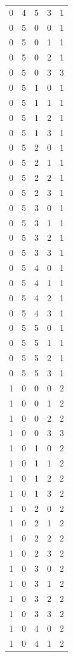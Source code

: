 \begin{longtable}{rrrrr}
0 & 4 & 5 & 3 & 1 \\
0 & 5 & 0 & 0 & 1 \\
0 & 5 & 0 & 1 & 1 \\
0 & 5 & 0 & 2 & 1 \\
0 & 5 & 0 & 3 & 3 \\
0 & 5 & 1 & 0 & 1 \\
0 & 5 & 1 & 1 & 1 \\
0 & 5 & 1 & 2 & 1 \\
0 & 5 & 1 & 3 & 1 \\
0 & 5 & 2 & 0 & 1 \\
0 & 5 & 2 & 1 & 1 \\
0 & 5 & 2 & 2 & 1 \\
0 & 5 & 2 & 3 & 1 \\
0 & 5 & 3 & 0 & 1 \\
0 & 5 & 3 & 1 & 1 \\
0 & 5 & 3 & 2 & 1 \\
0 & 5 & 3 & 3 & 1 \\
0 & 5 & 4 & 0 & 1 \\
0 & 5 & 4 & 1 & 1 \\
0 & 5 & 4 & 2 & 1 \\
0 & 5 & 4 & 3 & 1 \\
0 & 5 & 5 & 0 & 1 \\
0 & 5 & 5 & 1 & 1 \\
0 & 5 & 5 & 2 & 1 \\
0 & 5 & 5 & 3 & 1 \\
1 & 0 & 0 & 0 & 2 \\
1 & 0 & 0 & 1 & 2 \\
1 & 0 & 0 & 2 & 2 \\
1 & 0 & 0 & 3 & 3 \\
1 & 0 & 1 & 0 & 2 \\
1 & 0 & 1 & 1 & 2 \\
1 & 0 & 1 & 2 & 2 \\
1 & 0 & 1 & 3 & 2 \\
1 & 0 & 2 & 0 & 2 \\
1 & 0 & 2 & 1 & 2 \\
1 & 0 & 2 & 2 & 2 \\
1 & 0 & 2 & 3 & 2 \\
1 & 0 & 3 & 0 & 2 \\
1 & 0 & 3 & 1 & 2 \\
1 & 0 & 3 & 2 & 2 \\
1 & 0 & 3 & 3 & 2 \\
1 & 0 & 4 & 0 & 2 \\
1 & 0 & 4 & 1 & 2 \\

\end{longtable}
